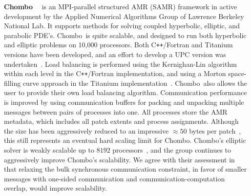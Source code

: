 \documentclass[11pt,letterpaper]{article}
\newcommand{\pp}{\texttt{++}}
\newcommand{\cpp}{C\pp}
\newcommand{\chombo}{\textsf{Chombo}}
\begin{document}

\textbf{\chombo}~\cite{wwwchombo}~\cite{CoGr09} is an MPI-parallel
structured AMR (SAMR) framework in active development by the Applied
Numerical Algorithms Group of Lawrence Berkeley National Lab.  It
supports methods for solving coupled hyperbolic, elliptic, and
parabolic PDE's.  \chombo\ is quite scalable, and designed to run both
hyperbolic and elliptic problems on 10,000 processors.  Both
\cpp/Fortran and Titanium~\cite{wwwtitanium}~\cite{YeSe98} versions
have been developed, and an effort to develop a UPC version was
undertaken~\cite{We04}.  Load balancing is performed using the
Kernighan-Lin algorithm within each level in the \cpp/Fortran
implementation, and using a Morton space-filling curve approach in the
Titanium implementation~\cite{WeSu07}.  \chombo\ also allows the user
to provide their own load balancing algorithm.  Communication
performance is improved by using communication buffers for packing and
unpacking multiple messages between pairs of processes into one.  All
processes store the AMR metadata, which includes all patch extents and
process assignments.  Although the size has been aggressively reduced
to an impressive $\approx 50$ bytes per patch~\cite{CoBe07}, this
still represents an eventual hard scaling limit for \chombo.
\chombo's elliptic solver is weakly scalable up to $8192$
processors~\cite{WeSu07}, and the group continues to aggressively
improve \chombo's scalability.  We agree with their assessment
in~\cite{WeSu07} that relaxing the bulk synchronous communication
constraint, in favor of smaller messages with one-sided communication
and communication-computation overlap, would improve scalability.

\end{document}
